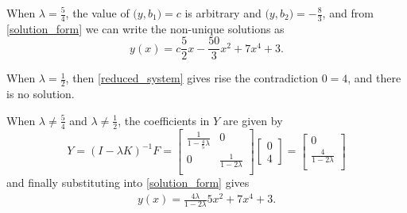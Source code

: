 \documentclass{homework}
\begin{document}
\begin{solution}
  When $\lambda = \frac54$, the value of $\Big(y,b_1\Big) = c$ is arbitrary and $\Big(y,b_2\Big) = -\frac 83$, and from \eqref{solution_form} we can write the non-unique solutions as 
  $$
    y(x) = c \frac 52 x  -  \frac {50}3 x^2 + 7x^4 +3.
  $$

  When $\lambda = \frac 12$, then \eqref{reduced_system} gives rise the contradiction $0=4$, and there is no solution.

  When $\lambda\not= \frac 54$ and $\lambda\not= \frac 12$, the coefficients in $Y$ are given by
  $$
    \renewcommand{\arraystretch}{2.5}
    Y = (I-\lambda K)^{-1} F = 
    \begin{bmatrix}
      {\displaystyle \frac{1}{1-  \frac 45\lambda}} & 0\\
      0 & {\displaystyle \frac{1}{1-  2\lambda}}\\
    \end{bmatrix}
    \begin{bmatrix}
     0\\
     4
    \end{bmatrix}
      = 
    \begin{bmatrix}
      0\\
      {\displaystyle \frac{4}{1-  2\lambda}}\\
    \end{bmatrix}
  $$
  and finally substituting into \eqref{solution_form} gives
  \begin{align*}
    y(x) = \frac{4\lambda }{1-  2\lambda} 5x^2 + 7x^4 + 3.
  \end{align*}
\end{solution}
\end{document}
